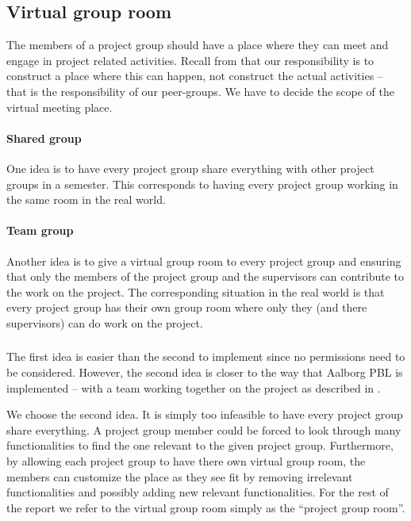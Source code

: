 \subsection{Virtual group room}
The members of a project group should have a place where they can meet and engage in project related activities.
Recall from  that our responsibility is to construct a place where this can happen, not construct the actual activities -- that is the responsibility of our peer-groups.
We have to decide the scope of the virtual meeting place.

\paragraph{Shared group}
One idea is to have every project group share everything with other project groups in a semester.
This corresponds to having every project group working in the same room in the real world.

\paragraph{Team group}
Another idea is to give a virtual group room to every project group and ensuring that only the members of the project group and the supervisors can contribute to the work on the project.
The corresponding situation in the real world is that every project group has their own group room where only they (and there supervisors) can do work on the project.

\subsubsection{}
The first idea is easier than the second to implement since no permissions need to be considered.
However, the second idea is closer to the way that Aalborg PBL is implemented -- with a team working together on the project as described in .

We choose the second idea. 
It is simply too infeasible to have every project group share everything.
A project group member could be forced to look through many functionalities to find the one relevant to the given project group.
Furthermore, by allowing each project group to have there own virtual group room, the members can customize the place as they see fit by removing irrelevant functionalities and possibly adding new relevant functionalities.
For the rest of the report we refer to the virtual group room simply as the ``project group room''.

